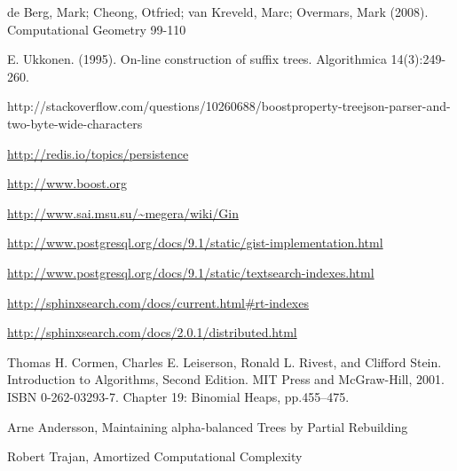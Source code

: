 \documentclass[10pt,a4paper]{article}
\begin{document}
\begin{thebibliography}{99}

 de Berg, Mark; Cheong, Otfried; van Kreveld, Marc; Overmars, Mark (2008). Computational Geometry 99-110

 E. Ukkonen. (1995). On-line construction of suffix trees. Algorithmica 14(3):249-260.

 http://stackoverflow.com/questions/10260688/boostproperty-treejson-parser-and-two-byte-wide-characters

 \url{http://redis.io/topics/persistence}

 \url{http://www.boost.org}

 \url{http://www.sai.msu.su/~megera/wiki/Gin}

 \url{http://www.postgresql.org/docs/9.1/static/gist-implementation.html}

 \url{http://www.postgresql.org/docs/9.1/static/textsearch-indexes.html}

 \url{http://sphinxsearch.com/docs/current.html#rt-indexes}

 \url{http://sphinxsearch.com/docs/2.0.1/distributed.html}

Thomas H. Cormen, Charles E. Leiserson, Ronald L. Rivest, and Clifford Stein. Introduction to Algorithms, Second Edition. MIT Press and McGraw-Hill, 2001. ISBN 0-262-03293-7. Chapter 19: Binomial Heaps, pp.455–475.

 Arne Andersson, Maintaining alpha-balanced Trees by Partial Rebuilding

 Robert Trajan, Amortized Computational Complexity

\end{thebibliography}
\end{document}
